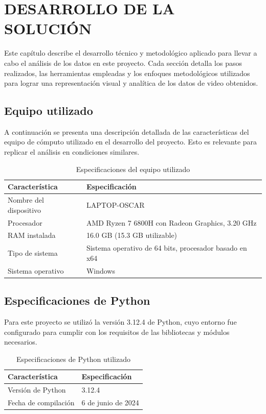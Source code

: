 \chapter{DESARROLLO DE LA SOLUCIÓN}

Este capítulo describe el desarrollo técnico y metodológico aplicado para llevar a cabo el análisis de los datos en este proyecto. Cada sección detalla los pasos realizados, las herramientas empleadas y los enfoques metodológicos utilizados para lograr una representación visual y analítica de los datos de video obtenidos.

\section{Equipo utilizado}
A continuación se presenta una descripción detallada de las características del equipo de cómputo utilizado en el desarrollo del proyecto. Esto es relevante para replicar el análisis en condiciones similares.

\begin{table}[H]
    \centering
    \caption{Especificaciones del equipo utilizado}
    \begin{tabular}{p{5cm} p{8cm}} \hline
        \textbf{Característica} & \textbf{Especificación} \\ \hline
        Nombre del dispositivo & LAPTOP-OSCAR \\
        Procesador & AMD Ryzen 7 6800H con Radeon Graphics, 3.20 GHz \\
        RAM instalada & 16.0 GB (15.3 GB utilizable) \\
        Tipo de sistema & Sistema operativo de 64 bits, procesador basado en x64 \\
        Sistema operativo & Windows \\ \hline
    \end{tabular}
    \label{tabla:laptop}
\end{table}
\section{Especificaciones de Python}
Para este proyecto se utilizó la versión 3.12.4 de Python, cuyo entorno fue configurado para cumplir con los requisitos de las bibliotecas y módulos necesarios.

\begin{table}[H]
    \centering
    \caption{Especificaciones de Python utilizado}
    \begin{tabular}{p{5cm} p{8cm}} \hline
        \textbf{Característica} & \textbf{Especificación} \\ \hline
        Versión de Python & 3.12.4 \\
        Fecha de compilación & 6 de junio de 2024 \\ \hline
    \end{tabular}
    \label{tabla:python}
\end{table}

